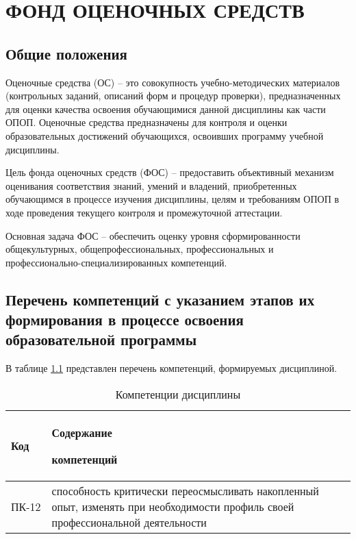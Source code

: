 \chapter{ФОНД ОЦЕНОЧНЫХ СРЕДСТВ} \label{AppendixA}

\section{Общие положения} \label{sectionA1}
Оценочные средства (ОС) – это совокупность учебно-методических материалов (контрольных заданий, описаний форм и процедур проверки), предназначенных для оценки качества освоения обучающимися данной дисциплины как части ОПОП. Оценочные средства предназначены для контроля и оценки образовательных достижений обучающихся, освоивших программу учебной дисциплины. 

Цель фонда оценочных средств (ФОС) – предоставить объективный механизм оценивания соответствия знаний, умений и владений, приобретенных обучающимся в процессе изучения дисциплины, целям и требованиям ОПОП в ходе проведения текущего контроля и промежуточной аттестации.

Основная задача ФОС – обеспечить оценку уровня сформированности общекультурных, общепрофессиональных, профессиональных и профессионально-специализированных компетенций.

\section{Перечень компетенций с указанием этапов их формирования в процессе освоения образовательной программы}

В таблице \ref{tblCompetentionsA} представлен перечень компетенций, формируемых дисциплиной.

\begin{table} [ht]%
	\caption{Компетенции дисциплины}
	\label{tblCompetentionsA}	
	\begin{tabularx}{\textwidth}{p{}X}
        \toprule
    	\textbf{Код} & \textbf{Содержание} \par \textbf{компетенций}\\
        \midrule 
  		ПК-12 & способность критически переосмысливать накопленный опыт, изменять при необходимости профиль своей профессиональной деятельности\\
        \bottomrule
	\end{tabularx}
\end{table}

